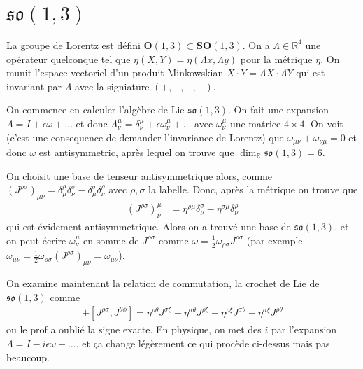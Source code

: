 \documentclass[10pt]{report}
\begin{document}
\section{$\mathfrak{so}(1,3)$}

La groupe de Lorentz est d\'efini $\mathbf{O}(1,3) \subset \mathbf{SO}(1,3)$. On a $\Lambda \in \mathbb{R}^4$ une op\'erateur quelconque tel que $\eta(X,Y) = \eta(\Lambda x, \Lambda y)$ pour la m\'etrique $\eta$. On munit l'espace vectoriel d'un produit Minkowskian $X\cdot Y = \Lambda X \cdot \Lambda Y$ qui est invariant par $\Lambda$ avec la signiature $(+,-,-,-)$.

On commence en calculer l'alg\`ebre de Lie $\mathfrak{so}(1,3)$. On fait une expansion $\Lambda = I + \epsilon\omega +\dots$ et donc $\Lambda^{\mu}_\nu = \delta^\mu_\nu + \epsilon \omega^\mu_\nu +\dots$ avec $\omega^\mu_\nu$ une matrice $4\times4$. On voit (c'est une consequence de demander l'invariance de Lorentz) que $\omega_{\mu\nu} + \omega_{\nu\mu} = 0$ et donc $\omega$ est antisymmetric, apr\`es lequel on trouve que $\dim_{\mathbb{R}} \mathfrak{so}(1,3) = 6$. 

On choisit une base de tenseur antisymmetrique alors, comme $\left( J^{\rho\sigma} \right)_{\mu\nu} = \delta^\rho_\mu\delta^\sigma_\nu - \delta^\sigma_\mu\delta^\rho_\nu$ avec $\rho,\sigma$ la labelle. Donc, apr\`es la m\'etrique on trouve que
\begin{align}
    \left(J^{\rho\sigma}\right)^\mu_\nu &= \eta^{\rho\mu}\delta^\sigma_\nu - \eta^{\sigma\mu}\delta^{\rho}_\nu
\end{align}
qui est \'evidement antisymmetrique. Alors on a trouv\'e une base de $\mathfrak{so}(1,3)$, et on peut \'ecrire $\omega^\mu_\nu$ en somme de $J^{\rho\sigma}$ comme $\omega = \frac{1}{2}\omega_{\rho\sigma}J^{\rho\sigma}$ (par exemple $\omega_{\mu\nu} = \frac{1}{2}\omega_{\rho\sigma}\left(J^{\rho\sigma}\right)_{\mu\nu} = \omega_{\mu\nu}$).

On examine maintenant la relation de commutation, la crochet de Lie de $\mathfrak{so}(1,3)$ comme 
\begin{align}
    \pm\left[ J^{\rho\sigma}, J^{\theta\phi} \right] = \eta^{\rho\theta}J^{\sigma\xi} - \eta^{\sigma\theta}J^{\rho\xi} - \eta^{\rho\xi}J^{\sigma\theta} + \eta^{\sigma\xi}J^{\rho\theta}
\end{align}
ou le prof a oubli\'e la signe exacte. En physique, on met des $i$ par l'expansion $\Lambda = I - i\epsilon\omega +\dots$, et \c{c}a change l\'eg\`erement ce qui proc\`ede ci-dessus mais pas beaucoup.
\end{document}
